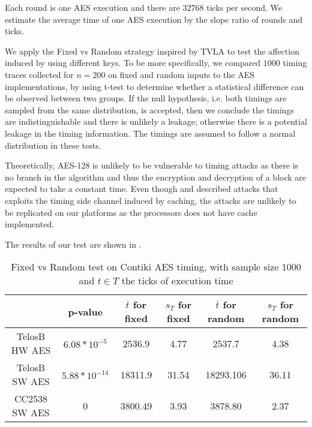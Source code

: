 Each round is one AES execution and there are $32768$ ticks per second. We estimate the average time of one AES execution by the slope ratio of rounds and ticks.

We apply the Fixed vs Random strategy inspired by TVLA\cite{TVLA} to test the affection induced by using different keys. To be more specifically, we compared $1000$ timing traces collected for $n=200$ on fixed and random inputs to the AES implementations, by using t-test to determine whether a statistical difference can be observed  between two groups. If the null hypothesis, i.e. both timings are sampled from the same distribution, is accepted, then we conclude the timings are indistinguishable and there is unlikely  a leakage; otherwise there is a potential leakage in the timing information. The timings are assumed to follow a normal distribution in these tests.

Theoretically, AES-128 is unlikely to be vulnerable to timing attacks as there is no branch in the algorithm and thus the encryption and decryption of a block are expected to take a constant time. Even though \cite{Cache-Timing1} and \cite{Cache-Timing2} described attacks that exploits the timing side channel induced by caching, the attacks are unlikely to be replicated on our platforms as the processors does not have cache implemented. 

The results of our test are shown in .

\begin{table}[ht!]
	\centering
	\begin{tabular}{|c|c|c|c|c|c|}
		\hline
		              & p-value           & $\overline{t}$ for fixed & $s_{T}$ for fixed & $\overline{t}$ for random & $s_{T}$ for random\\ \hline
		TelosB HW AES & $6.08 * 10^{-5}$  & 2536.9     & 4.77      & 2537.7      & 4.38       \\ \hline
		TelosB SW AES & $5.88 * 10^{-14}$ & 18311.9    & 31.54     & 18293.106   & 36.11      \\ \hline
		CC2538 SW AES & 0                 & 3800.49    & 3.93      & 3878.80     & 2.37       \\ \hline
	\end{tabular}
	\caption{Fixed vs Random test on Contiki AES timing, with sample size 1000 and $t \in T$ the ticks of execution time}
	\label{Tbl: Fixed vs Random test on Contiki AES timing}
\end{table}



